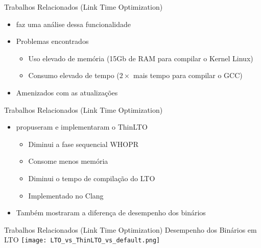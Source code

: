 \begin{frame}{Trabalhos Relacionados (Link Time Optimization)}
    \begin{itemize}
        \item \cite{livska2014optimizing} faz uma análise dessa funcionalidade
        \item Problemas encontrados
            \begin{itemize}
                \item Uso elevado de memória (15Gb de RAM para compilar o Kernel Linux)
                \item Consumo elevado de tempo ($2\times$ mais tempo para compilar o GCC)
            \end{itemize}
        \item Amenizados com as atualizações
    \end{itemize}
\end{frame}

\begin{frame}{Trabalhos Relacionados (Link Time Optimization)}
    \begin{itemize}
        \item \cite{Johnson:2017:TSI:3049832.3049845} propuseram e implementaram o ThinLTO
            \begin{itemize}
                \item Diminui a fase sequencial WHOPR
                \item Consome menos memória
                \item Diminui o tempo de compilação do LTO
                \item Implementado no Clang
            \end{itemize}
        \item Também mostraram a diferença de desempenho dos binários
    \end{itemize}
\end{frame}

\begin{frame}{Trabalhos Relacionados (Link Time Optimization)}
    Desempenho dos Binários em LTO \citep{Johnson:2017:TSI:3049832.3049845}
    \texttt{[image: LTO\_vs\_ThinLTO\_vs\_default.png]}
    \label{fig:desempenho_lto}
\end{frame}

